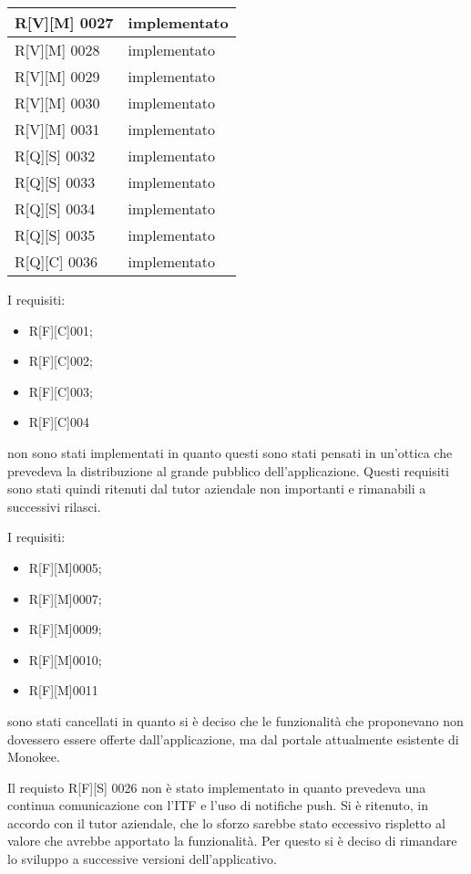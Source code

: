 \begin{center}
\begin{longtable}{|p{3cm}|p{3cm}|}
    \hline
    R[V][M] 0027    & implementato  \\
    \hline
    R[V][M] 0028    & implementato  \\
    \hline
    R[V][M] 0029    & implementato  \\
    \hline
    R[V][M] 0030    & implementato  \\
    \hline
    R[V][M] 0031    & implementato  \\
    \hline
    R[Q][S] 0032    & implementato  \\
    \hline
    R[Q][S] 0033    & implementato  \\
    \hline
    R[Q][S] 0034    & implementato  \\
    \hline
    R[Q][S] 0035    & implementato  \\
    \hline
    R[Q][C] 0036    & implementato  \\
    \hline
    \end{longtable}
    \end{center}

I requisiti:
\begin{itemize}
    \item R[F][C]001;
    \item R[F][C]002;
    \item R[F][C]003;
    \item R[F][C]004
\end{itemize}
non sono stati implementati in quanto questi sono stati pensati in un'ottica che prevedeva la distribuzione al grande pubblico dell'applicazione. Questi requisiti sono stati quindi ritenuti dal tutor aziendale non importanti e rimanabili a successivi rilasci.

I requisiti: 
\begin{itemize}
    \item R[F][M]0005; 
    \item R[F][M]0007; 
    \item R[F][M]0009; 
    \item R[F][M]0010; 
    \item R[F][M]0011 
\end{itemize}
sono stati cancellati in quanto si è deciso che le funzionalità che proponevano non dovessero essere offerte dall'applicazione, ma dal portale attualmente esistente di Monokee.

Il requisto R[F][S] 0026 non è stato implementato in quanto prevedeva una continua comunicazione con l'ITF e l'uso di notifiche push. Si è ritenuto, in accordo con il tutor aziendale, che lo sforzo sarebbe stato eccessivo rispletto al valore che avrebbe apportato la funzionalità. Per questo si è deciso di rimandare lo sviluppo a successive versioni dell'applicativo.


